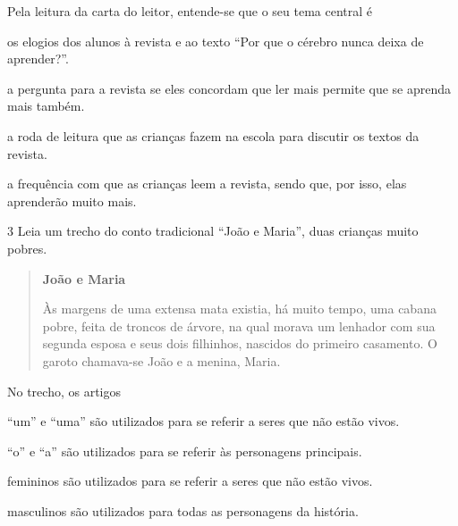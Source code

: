 
Pela leitura da carta do leitor, entende-se que o seu tema central é

\begin{escolha}
\item os elogios dos alunos à revista e ao texto ``Por que o cérebro nunca 
deixa de aprender?''.

\item a pergunta para a revista se eles concordam que ler mais permite que
se aprenda mais também.

\item a roda de leitura que as crianças fazem na escola para discutir
os textos da revista.

\item a frequência com que as crianças leem a revista, sendo que, por
isso, elas aprenderão muito mais.
\end{escolha}



\num{3} Leia um trecho do conto tradicional ``João e Maria'', duas crianças muito pobres.

\begin{quote}
\textbf{João e Maria}

Às margens de uma extensa mata existia, há muito tempo, uma cabana
pobre, feita de troncos de árvore, na qual morava um lenhador com sua
segunda esposa e seus dois filhinhos, nascidos do primeiro casamento. 
O garoto chamava-se João e a menina, Maria.
\end{quote}


No trecho, os artigos

\begin{escolha}
\item ``um'' e ``uma'' são utilizados para se referir a seres que não estão vivos.

\item ``o'' e ``a'' são utilizados para se referir às personagens principais.

\item femininos são utilizados para se referir a seres que não estão vivos.

\item masculinos são utilizados para todas as personagens da história.
\end{escolha}


